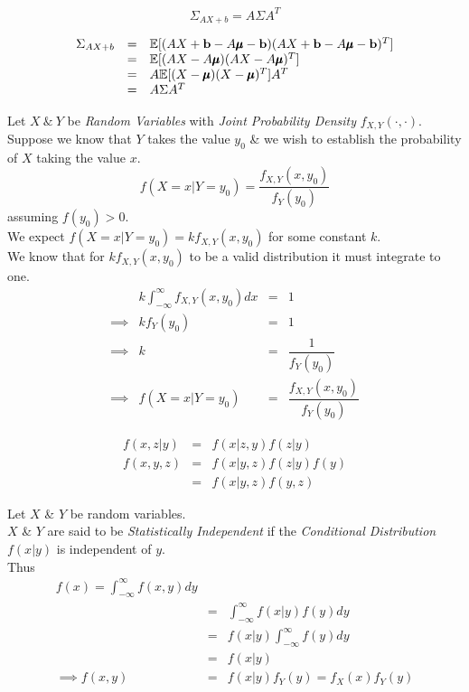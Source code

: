 \documentclass[11pt,a4paper]{article}
\begin{document}
$$\Sigma_{AX+b}=A\Sigma A^T$$

\[\begin{array}{rcl}
\Sigma_{AX+b}&=&\mathbb{E}[(AX+\textbf{b}-A\pmb\mu-\textbf{b})(AX+\textbf{b}-A\pmb\mu-\textbf{b})^T]\\
&=&\mathbb{E}[(AX-A\pmb\mu)(AX-A\pmb\mu)^T]\\
&=&A\mathbb{E}[(X-\pmb\mu)(X-\pmb\mu)^T]A^T\\
&=&A\Sigma A^T
\end{array}\]

Let $X\ \&\ Y$ be \textit{Random Variables} with \textit{Joint Probability Density} $f_{X,Y}(\cdot,\cdot)$.\\
Suppose we know that $Y$ takes the value $y_0$ \& we wish to establish the probability of $X$ taking the value $x$.
$$f(X=x|Y=y_0)=\dfrac{f_{X,Y}(x,y_0)}{f_Y(y_0)}$$
assuming $f(y_0)>0$.\\

We expect $f(X=x|Y=y_0)=kf_{X,Y}(x,y_0)$ for some constant $k$.\\
We know that for $kf_{X,Y}(x,y_0)$ to be a valid distribution it must integrate to one.
\[\begin{array}{rrcl}
&k\displaystyle\int_{-\infty}^\infty f_{X,Y}(x,y_0)dx&=&1\\
\implies&kf_Y(y_0)&=&1\\
\implies&k&=&\dfrac{1}{f_Y(y_0)}\\
\implies&f(X=x|Y=y_0)&=&\dfrac{f_{X,Y}(x,y_0)}{f_Y(y_0)}
\end{array}\]

\[\begin{array}{rcl}
f(x,z|y)&=&f(x|z,y)f(z|y)\\
f(x,y,z)&=&f(x|y,z)f(z|y)f(y)\\
&=&f(x|y,z)f(y,z)
\end{array}\]

Let $X$ \& $Y$ be random variables.\\
$X$ \& $Y$ are said to be \textit{Statistically Independent} if the \textit{Conditional Distribution} $f(x|y)$ is independent of $y$.\\
Thus
\[\begin{array}{rcl}
f(x)=\displaystyle\int_{-\infty}^\infty f(x,y)dy\\
&=&\displaystyle\int_{-\infty}^\infty f(x|y)f(y)dy\\
&=&f(x|y)\displaystyle\int_{-\infty}^\infty f(y)dy\\
&=&f(x|y)\\
\implies f(x,y)&=&f(x|y)f_Y(y)=f_X(x)f_Y(y)
\end{array}\]
\end{document}
